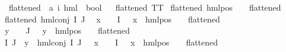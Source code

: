 \begin{isabellebody}
\isanewline
\isanewline
\isanewline
\isanewline
\isanewline
\isanewline
{}\isamarkupfalse%
\ flattened\ {\isacharcolon}{\kern0pt}{\isacharcolon}{\kern0pt}\ {\isachardoublequoteopen}{\isacharparenleft}{\kern0pt}{\isacharprime}{\kern0pt}a{\isacharcomma}{\kern0pt}\ {\isacharprime}{\kern0pt}i{\isacharparenright}{\kern0pt}\ hml\ {\isasymRightarrow}\ bool{\isachardoublequoteclose}\isanewline
\ \ \isanewline
{\isachardoublequoteopen}flattened\ TT{\isachardoublequoteclose}\ {\isacharbar}{\kern0pt}\isanewline
{\isachardoublequoteopen}flattened\ {\isacharparenleft}{\kern0pt}hml{\isacharunderscore}{\kern0pt}pos\ {\isacharunderscore}{\kern0pt}\ {\isasympsi}{\isacharparenright}{\kern0pt}{\isachardoublequoteclose}\ \ {\isachardoublequoteopen}flattened\ {\isasympsi}{\isachardoublequoteclose}{\isacharbar}{\kern0pt}\isanewline
{\isachardoublequoteopen}flattened\ {\isacharparenleft}{\kern0pt}hml{\isacharunderscore}{\kern0pt}conj\ I\ J\ {\isasymPhi}{\isacharparenright}{\kern0pt}{\isachardoublequoteclose}\isanewline
{}\ {\isachardoublequoteopen}{\isasymforall}x\ {\isasymin}\ {\isacharparenleft}{\kern0pt}{\isasymPhi}\ {\isacharbackquote}{\kern0pt}\ I{\isacharparenright}{\kern0pt}{\isachardot}{\kern0pt}\ {\isacharparenleft}{\kern0pt}{\isasymexists}{\isasymalpha}\ {\isasympsi}{\isachardot}{\kern0pt}\ x\ {\isacharequal}{\kern0pt}\ {\isacharparenleft}{\kern0pt}hml{\isacharunderscore}{\kern0pt}pos\ {\isasymalpha}\ {\isasympsi}{\isacharparenright}{\kern0pt}\ {\isasymand}\ flattened\ {\isasympsi}{\isacharparenright}{\kern0pt}{\isachardoublequoteclose}\isanewline
{\isachardoublequoteopen}{\isasymforall}y\ {\isasymin}\ {\isacharparenleft}{\kern0pt}{\isasymPhi}\ {\isacharbackquote}{\kern0pt}\ J{\isacharparenright}{\kern0pt}{\isachardot}{\kern0pt}\ {\isacharparenleft}{\kern0pt}{\isasymexists}{\isasymalpha}\ {\isasympsi}{\isachardot}{\kern0pt}\ y\ {\isacharequal}{\kern0pt}\ {\isacharparenleft}{\kern0pt}hml{\isacharunderscore}{\kern0pt}pos\ {\isasymalpha}\ {\isasympsi}{\isacharparenright}{\kern0pt}\ {\isasymand}\ flattened\ {\isasympsi}{\isacharparenright}{\kern0pt}\ {\isasymor}\ \isanewline
{\isacharparenleft}{\kern0pt}{\isasymexists}I{\isacharprime}{\kern0pt}\ J{\isacharprime}{\kern0pt}\ {\isasymPhi}{\isacharprime}{\kern0pt}{\isachardot}{\kern0pt}\ y\ {\isacharequal}{\kern0pt}\ {\isacharparenleft}{\kern0pt}hml{\isacharunderscore}{\kern0pt}conj\ I{\isacharprime}{\kern0pt}\ J{\isacharprime}{\kern0pt}\ {\isasymPhi}{\isacharprime}{\kern0pt}{\isacharparenright}{\kern0pt}\ {\isasymand}\ {\isacharparenleft}{\kern0pt}{\isasymforall}x\ {\isasymin}\ {\isasymPhi}{\isacharprime}{\kern0pt}\ {\isacharbackquote}{\kern0pt}\ I{\isacharprime}{\kern0pt}{\isachardot}{\kern0pt}\ {\isacharparenleft}{\kern0pt}{\isasymexists}{\isasymalpha}\ {\isasympsi}{\isachardot}{\kern0pt}\ x\ {\isacharequal}{\kern0pt}\ {\isacharparenleft}{\kern0pt}hml{\isacharunderscore}{\kern0pt}pos\ {\isasymalpha}\ {\isasympsi}{\isacharparenright}{\kern0pt}\ {\isasymand}\ flattened\ {\isasympsi}{\isacharparenright}{\kern0pt}{\isacharparenright}{\kern0pt}\isanewline

\end{isabellebody}
